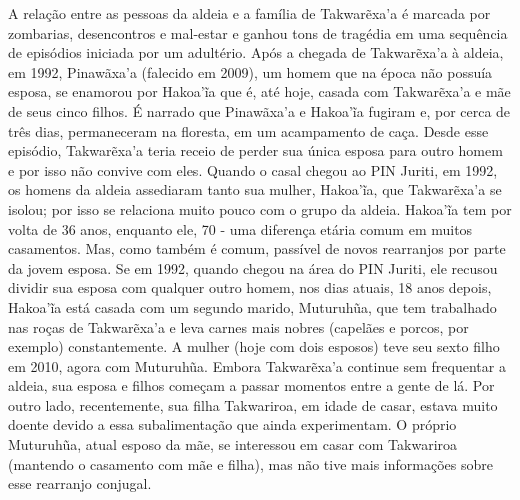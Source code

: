 A relação entre as pessoas da aldeia e a família de Takwarẽxa'a é
marcada por zombarias, desencontros e mal-estar e ganhou tons de
tragédia em uma sequência de episódios iniciada por um adultério. Após a
chegada de Takwarẽxa'a à aldeia, em 1992, Pinawãxa'a (falecido em 2009),
um homem que na época não possuía esposa, se enamorou por Hakoa'ĩa que
é, até hoje, casada com Takwarẽxa'a e mãe de seus cinco filhos. É
narrado que Pinawãxa'a e Hakoa'ĩa fugiram e, por cerca de três dias,
permaneceram na floresta, em um acampamento de caça. Desde esse
episódio, Takwarẽxa'a teria receio de perder sua única esposa para outro
homem e por isso não convive com eles. Quando o casal chegou ao PIN
Juriti, em 1992, os homens da aldeia assediaram tanto sua mulher,
Hakoa'ĩa, que Takwarẽxa'a se isolou; por isso se relaciona muito pouco
com o grupo da aldeia. Hakoa'ĩa tem por volta de 36 anos, enquanto ele,
70 - uma diferença etária comum em muitos casamentos. Mas, como também é
comum, passível de novos rearranjos por parte da jovem esposa. Se em
1992, quando chegou na área do PIN Juriti, ele recusou dividir sua
esposa com qualquer outro homem, nos dias atuais, 18 anos depois,
Hakoa'ĩa está casada com um segundo marido, Muturuhũa, que tem
trabalhado nas roças de Takwarẽxa'a e leva carnes mais nobres (capelães
e porcos, por exemplo) constantemente. A mulher (hoje com dois esposos)
teve seu sexto filho em 2010, agora com Muturuhũa. Embora Takwarẽxa'a
continue sem frequentar a aldeia, sua esposa e filhos começam a passar
momentos entre a gente de lá. Por outro lado, recentemente, sua filha
Takwariroa, em idade de casar, estava muito doente devido a essa
subalimentação que ainda experimentam. O próprio Muturuhũa, atual esposo
da mãe, se interessou em casar com Takwariroa (mantendo o casamento com
mãe e filha), mas não tive mais informações sobre esse rearranjo
conjugal.

